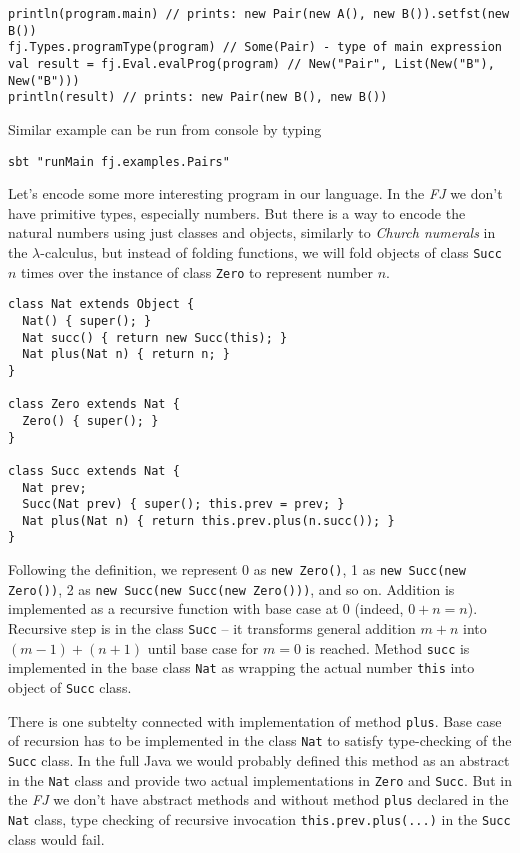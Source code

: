 \documentclass{article}[12pt]
\begin{document}
\begin{verbatim}
println(program.main) // prints: new Pair(new A(), new B()).setfst(new B())
fj.Types.programType(program) // Some(Pair) - type of main expression
val result = fj.Eval.evalProg(program) // New("Pair", List(New("B"), New("B")))
println(result) // prints: new Pair(new B(), new B())
\end{verbatim}
Similar example can be run from console by typing

\begin{verbatim}
sbt "runMain fj.examples.Pairs"
\end{verbatim}

Let's encode some more interesting program in our language. In
the \emph{FJ} we don't have primitive types, especially numbers.
But there is a way to encode the natural numbers using just classes
and objects, similarly to \emph{Church numerals} in
the $\lambda$-calculus, but instead of folding functions, we
will fold objects of class \texttt{Succ} $n$ times over the
instance of class \texttt{Zero} to represent number $n$.

\begin{verbatim}
class Nat extends Object {
  Nat() { super(); }
  Nat succ() { return new Succ(this); }
  Nat plus(Nat n) { return n; }
}

class Zero extends Nat { 
  Zero() { super(); }
}

class Succ extends Nat {
  Nat prev;
  Succ(Nat prev) { super(); this.prev = prev; }
  Nat plus(Nat n) { return this.prev.plus(n.succ()); }
}
\end{verbatim}

Following the definition, we represent 0 as \texttt{new Zero()},
1 as \texttt{new Succ(new Zero())},
2 as \texttt{new Succ(new Succ(new Zero()))}, and so on.
Addition is implemented as a recursive function with base case
at 0 (indeed, $0 + n = n$). Recursive step is in the class
\texttt{Succ} -- it transforms general addition $m + n$ into
$(m-1) + (n+1)$ until base case for $m = 0$ is reached.
Method \texttt{succ} is implemented in the base class
\texttt{Nat} as wrapping the actual number \texttt{this}
into object of \texttt{Succ} class.

There is one subtelty connected with implementation of method
\texttt{plus}. Base case of recursion has to be implemented in
the class \texttt{Nat} to satisfy type-checking of the
\texttt{Succ} class. In the full Java we would probably
defined this method as an abstract in the \texttt{Nat} class
and provide two actual implementations in \texttt{Zero} and 
\texttt{Succ}. But in the \emph{FJ} we don't have abstract
methods and without method \texttt{plus} declared in
the \texttt{Nat} class, type checking of recursive invocation 
\texttt{this.prev.plus(...)} in the \texttt{Succ} class
would fail.
\end{document}
